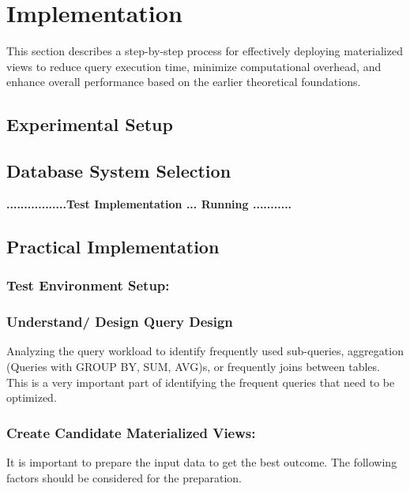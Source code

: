 \section{Implementation}
This section describes a step-by-step process for effectively deploying materialized views to reduce query execution time, minimize computational overhead, and enhance overall performance based on the earlier theoretical foundations. 
\subsection{Experimental Setup}
\subsection{Database System Selection}



 \begin{center}
     \textbf{.................Test Implementation ... Running ...........}
 \end{center}

\subsection{Practical Implementation}
\subsubsection{Test Environment Setup:}
\subsubsection{Understand/ Design Query Design} Analyzing the query workload to identify frequently used sub-queries, aggregation (Queries with GROUP BY, SUM, AVG)s, or frequently joins between tables. This is a very important part of identifying the frequent queries that need to be optimized.

\subsubsection{ Create Candidate Materialized Views:} It is important to prepare the input data to get the best outcome. The following factors should be considered for the preparation. 

